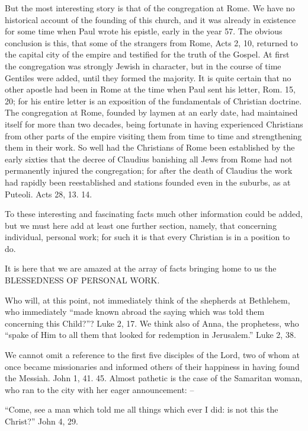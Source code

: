 \documentclass[
]{book}
\begin{document}
But the most interesting story is that of the congregation at Rome. We have no historical account of the founding of this church, and it was already in existence for some time when Paul wrote his epistle, early in the year 57. The obvious conclusion is this, that some of the strangers from Rome, Acts 2, 10, returned to the capital city of the empire and testified for the truth of the Gospel. At first the congregation was strongly Jewish in character, but in the course of time Gentiles were added, until they formed the majority. It is quite certain that no other apostle had been in Rome at the time when Paul sent his letter, Rom. 15, 20; for his entire letter is an exposition of the fundamentals of Christian doctrine. The congregation at Rome, founded by laymen at an early date, had maintained itself for more than two decades, being fortunate in having experienced Christians from other parts of the empire visiting them from time to time and strengthening them in their work. So well had the Christians of Rome been established by the early sixties that the decree of Claudius banishing all Jews from Rome had not permanently injured the congregation; for after the death of Claudius the work had rapidly been reestablished and stations founded even in the suburbs, as at Puteoli. Acts 28, 13. 14.

To these interesting and fascinating facts much other information could be added, but we must here add at least one further section, namely, that concerning individual, personal work; for such it is that every Christian is in a position to do.

It is here that we are amazed at the array of facts bringing home to us the BLESSEDNESS OF PERSONAL WORK.

Who will, at this point, not immediately think of the shepherds at Bethlehem, who immediately ``made known abroad the saying which was told them concerning this Child?''? Luke 2, 17. We think also of Anna, the prophetess, who ``spake of Him to all them that looked for redemption in Jerusalem.'' Luke 2, 38.

We cannot omit a reference to the first five disciples of the Lord, two of whom at once became missionaries and informed others of their happiness in having found the Messiah. John 1, 41. 45. Almost pathetic is the case of the Samaritan woman, who ran to the city with her eager announcement: --

``Come, see a man which told me all things which ever I did: is not this the Christ?'' John 4, 29.
\end{document}
